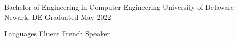 \documentclass[11pt, letterpaper]{awesome-cv}
\begin{document}

\begin{cventries}

  \cventry
    {Bachelor of Engineering in Computer Engineering}
    {University of Delaware}
    {Newark, DE}
    {Graduated May 2022}
    {}

\end{cventries}

\begin{cvskills}

  \cvskill
    {Languages}
    {Fluent French Speaker}

\end{cvskills}
\end{document}
